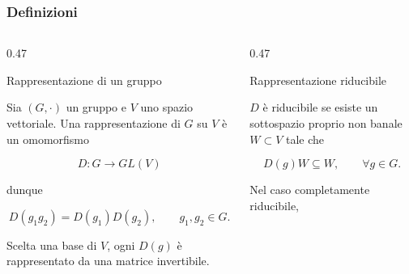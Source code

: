 \documentclass[11pt,t,aspectratio=169]{beamer}
\begin{document}
\begin{frame}[c]
    \frametitle{Definizioni}

    \begin{columns}[T,onlytextwidth]

        \begin{column}{0.47\textwidth}

            \begin{block}{Rappresentazione di un gruppo}

                \begin{minipage}[t][0.70\textheight][t]{\linewidth}

                    Sia $(G,\cdot)$ un gruppo e $V$ uno spazio vettoriale.
                    Una rappresentazione di $G$ su $V$ è un omomorfismo

                    \[
                        D:G\longrightarrow GL(V)
                    \]

                    dunque

                    \[
                        D(g_1g_2)=D(g_1)D(g_2),
                        \qquad g_1,g_2\in G.
                    \]

                    Scelta una base di $V$, ogni $D(g)$ è rappresentato
                    da una matrice invertibile.

                \end{minipage}

            \end{block}

        \end{column}

        \hfill

        \begin{column}{0.47\textwidth}

            \begin{exampleblock}{Rappresentazione riducibile}

                \begin{minipage}[t][0.70\textheight][t]{\linewidth}

                    $D$ è riducibile se esiste un sottospazio proprio
                    non banale $W\subset V$ tale che

                    \[
                        D(g)W\subseteq W,
                        \qquad \forall g\in G.
                    \]

                    Nel caso completamente riducibile,


\end{minipage}
\end{exampleblock}
\end{column}
\end{columns}
\end{frame}
\end{document}
